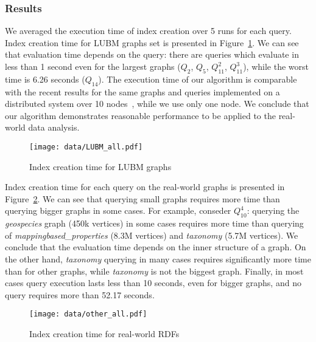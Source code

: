\subsubsection{Results}

We averaged the execution time of index creation over 5 runs for each query.
Index creation time for LUBM graphs set is presented in Figure~\ref{fig:lubm_all_qs}.
We can see that evaluation time depends on the query: there are queries which evaluate in less than 1 second even for the largest graphs ($Q_2$, $Q_5$, $Q_{11}^2$, $Q_{11}^3$), while the worst time is 6.26 seconds ($Q_{14}$).
The execution time of our algorithm is comparable with the recent results for the same graphs and queries implemented on a distributed system over 10 nodes~\citep{Wang2019}, while we use only one node.
We conclude that our algorithm demonstrates reasonable performance to be applied to the real-world data analysis.

\begin{figure}
    \centering
   \texttt{[image: data/LUBM\_all.pdf]}
   \caption{Index creation time for LUBM graphs}
   \label{fig:lubm_all_qs}
\end{figure}

Index creation time for each query on the real-world graphs is presented in Figure~\ref{fig:other_all_qs}.
We can see that querying small graphs requires more time than querying bigger graphs in some cases.
For example, conseder $Q_{10}^4$: querying the \textit{geospecies} graph (450k vertices) in some cases requires more time than querying of \textit{mappingbased\_properties} (8.3M vertices) and \textit{taxonomy} (5.7M vertices).
We conclude that the evaluation time depends on the inner structure of a graph.
On the other hand, \textit{taxonomy} querying in many cases requires significantly more time than for other graphs, while \textit{taxonomy} is not the biggest graph.
Finally, in most cases query execution lasts less than 10 seconds, even for bigger graphs, and no query requires more than 52.17 seconds.

\begin{figure}
    \centering
   \texttt{[image: data/other\_all.pdf]}
   \caption{Index creation time for real-world RDFs}
   \label{fig:other_all_qs}
\end{figure}


